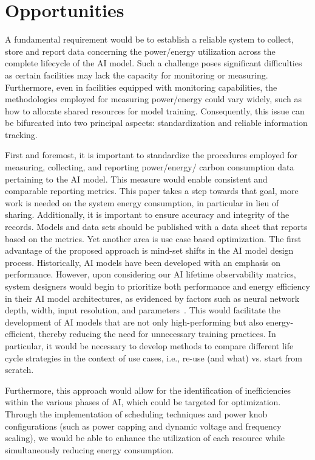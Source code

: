 \section{Opportunities}
{
    \label{opportunities}

    A fundamental requirement would be to establish a reliable system to collect, store and report data concerning the power/energy utilization across the complete lifecycle of the AI model. Such a challenge poses significant difficulties as certain facilities may lack the capacity for monitoring or measuring. Furthermore, even in facilities equipped with monitoring capabilities, the methodologies employed for measuring power/energy could vary widely, such as how to allocate shared resources for model training. Consequently, this issue can be bifurcated into two principal aspects: standardization and reliable information tracking.

    First and foremost, it is important to standardize the procedures employed for measuring, collecting, and reporting {power/energy/} carbon consumption data pertaining to the AI model. This measure would enable consistent and comparable reporting metrics. This paper takes a step towards that goal, more work is needed on the system energy consumption, in particular in lieu of sharing. Additionally, it is important to ensure accuracy and integrity of the records. 
Models and data sets should be published with a data sheet that reports based on the metrics. Yet another area is use case based optimization. The first advantage of the proposed approach is mind-set shifts in the AI model design process. Historically, AI models have been developed with an emphasis on performance. However, upon considering our AI lifetime observability matrics, system designers would begin to prioritize both performance and energy efficiency in their AI model architectures, as evidenced by factors such as neural network depth, width, input resolution, and parameters~\cite{Desislavov2023}. This would facilitate the development of AI models that are not only high-performing but also energy-efficient, thereby reducing the need for unnecessary training practices. In particular, it would be necessary to develop methods to compare different life cycle strategies in the context of use cases, i.e., re-use (and what) vs. start from scratch. 

    Furthermore, this approach would allow for the identification of inefficiencies within the various phases of AI, which could be targeted for optimization. Through the implementation of scheduling techniques and power knob configurations (such as power capping and dynamic voltage and frequency scaling), we would be able to enhance the utilization of each resource while simultaneously reducing energy consumption. 
}
